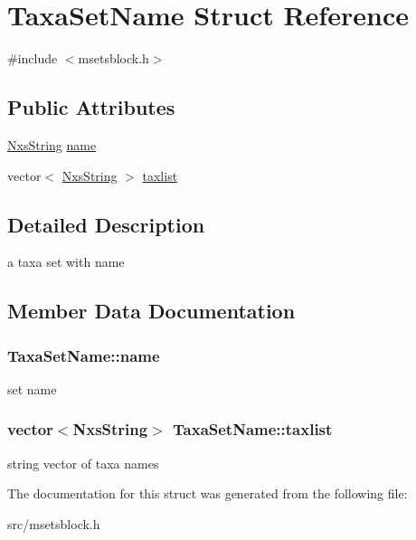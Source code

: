 \hypertarget{structTaxaSetName}{
\section{TaxaSetName Struct Reference}
\label{structTaxaSetName}
}


{\ttfamily \#include $<$msetsblock.h$>$}\subsection*{Public Attributes}
\begin{DoxyCompactItemize}
\item 
\hyperlink{classNxsString}{NxsString} \hyperlink{structTaxaSetName_a9adc1c9de597527395035d3cc40b7142}{name}
\item 
vector$<$ \hyperlink{classNxsString}{NxsString} $>$ \hyperlink{structTaxaSetName_a4471e5498ef139c69206baed2675c84d}{taxlist}
\end{DoxyCompactItemize}


\subsection{Detailed Description}
a taxa set with name 

\subsection{Member Data Documentation}
\hypertarget{structTaxaSetName_a9adc1c9de597527395035d3cc40b7142}{
\subsubsection[{name}]{ {\bf TaxaSetName::name}}}
\label{structTaxaSetName_a9adc1c9de597527395035d3cc40b7142}
set name \hypertarget{structTaxaSetName_a4471e5498ef139c69206baed2675c84d}{
\subsubsection[{taxlist}]{\setlength{\rightskip}{0pt plus 5cm}vector$<${\bf NxsString}$>$ {\bf TaxaSetName::taxlist}}}
\label{structTaxaSetName_a4471e5498ef139c69206baed2675c84d}
string vector of taxa names 

The documentation for this struct was generated from the following file:\begin{DoxyCompactItemize}
\item 
src/msetsblock.h\end{DoxyCompactItemize}
